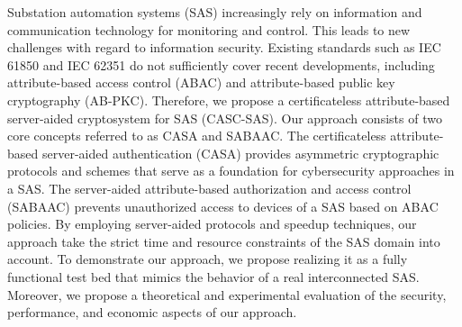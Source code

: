 \Abstract
Substation automation systems (SAS) increasingly rely on information and communication technology for monitoring and control.
This leads to new challenges with regard to information security.
Existing standards such as IEC 61850 and IEC 62351 do not sufficiently cover recent developments, including attribute-based access control (ABAC) and attribute-based public key cryptography (AB-PKC).
Therefore, we propose a certificateless attribute-based server-aided cryptosystem for SAS (CASC-SAS).
Our approach consists of two core concepts referred to as CASA and SABAAC.
The certificateless attribute-based server-aided authentication (CASA) provides asymmetric cryptographic protocols and schemes that serve as a foundation for cybersecurity approaches in a SAS.
The server-aided attribute-based authorization and access control (SABAAC) prevents unauthorized access to devices of a SAS based on ABAC policies.
By employing server-aided protocols and speedup techniques, our approach take the strict time and resource constraints of the SAS domain into account.
To demonstrate our approach, we propose realizing it as a fully functional test bed that mimics the behavior of a real interconnected SAS.
Moreover, we propose a theoretical and experimental evaluation of the security, performance, and economic aspects of our approach.
